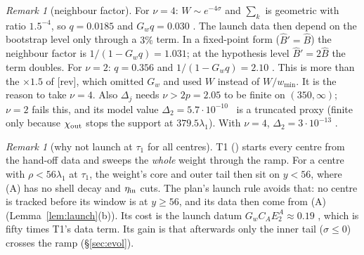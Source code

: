 \documentclass[11pt]{article}
\theoremstyle{remark}\newtheorem{remark}[theorem]{Remark}
\newcommand{\fn}[1]{\texttt{\detokenize{#1}}}
\begin{document}
\begin{remark}[neighbour factor]
For $\nu=4$: $W\sim e^{-4\sigma}$ and $\sum_k$ is geometric with ratio $1.5^{-4}$, so $q=0.0185$ and $G_wq=0.030$ \tE. The launch data then depend on the bootstrap level only through a $3\%$ term. In a fixed-point form ($\hat B'=\hat B$) the neighbour factor is $1/(1-G_wq)=1.031$; at the hypothesis level $\hat B'=2\hat B$ the term doubles. For $\nu=2$: $q=0.356$ and $1/(1-G_wq)=2.10$ \tE. This is more than the $\times1.5$ of [rev], which omitted $G_w$ and used $W$ instead of $W/w_{\min}$. It is the reason to take $\nu=4$. Also $\Delta_j$ needs $\nu>2p=2.05$ to be finite on $(350,\infty)$; $\nu=2$ fails this, and its model value $\Delta_2=5.7\cdot10^{-10}$ \tE\ is a truncated proxy (finite only because $\chi_{\rm out}$ stops the support at $379.5\lambda_1$). With $\nu=4$, $\Delta_2=3\cdot10^{-13}$ \tE.
\end{remark}
\begin{remark}[why not launch at $\tau_1$ for all centres]
T1 (\fn{t1_crude_shell_model.py}) starts every centre from the hand-off data and sweeps the \emph{whole} weight through the ramp. For a centre with $\rho<56\lambda_1$ at $\tau_1$, the weight's core and outer tail then sit on $y<56$, where (A) has no shell decay and $\eta_{\rm in}$ cuts. The plan's launch rule avoids that: no centre is tracked before its window is at $y\ge56$, and its data then come from (A) (Lemma~\ref{lem:launch}(b)). Its cost is the launch datum $G_wC_AE^A_2\approx0.19$ \tE, which is fifty times T1's data term. Its gain is that afterwards only the inner tail ($\sigma\le0$) crosses the ramp (\S\ref{sec:evol}).
\end{remark}
\end{document}
